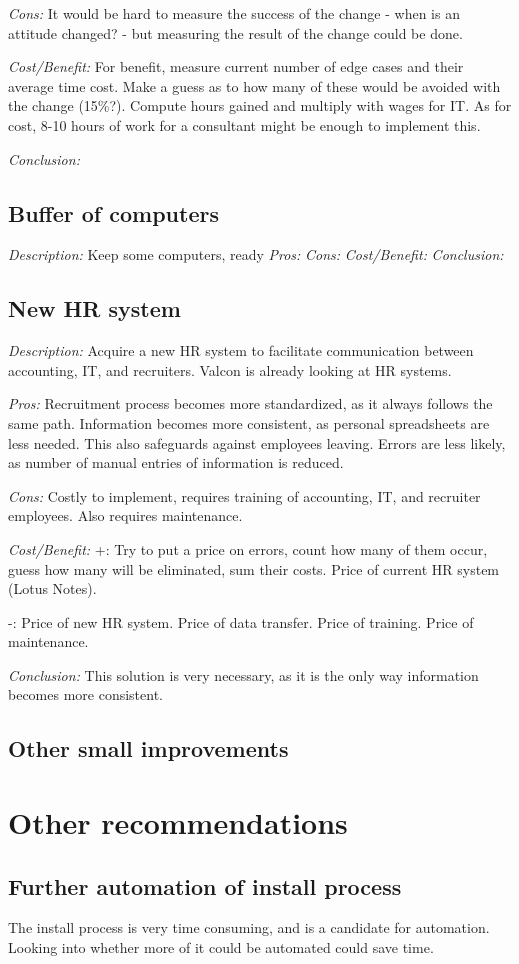 \emph{Cons:} It would be hard to measure the success of the change - when is an attitude changed? - but measuring the result of the change could be done.

\emph{Cost/Benefit:} For benefit, measure current number of edge cases and their average time cost.
Make a guess as to how many of these would be avoided with the change (15\%?).
Compute hours gained and multiply with wages for IT.
As for cost, 8-10 hours of work for a consultant might be enough to implement this.

\emph{Conclusion:} 

\subsection{Buffer of computers}
\emph{Description:} Keep some computers, ready 
\emph{Pros:}
\emph{Cons:}
\emph{Cost/Benefit:}
\emph{Conclusion:}

\subsection{New HR system}
\emph{Description:} Acquire a new HR system to facilitate communication between accounting, IT, and recruiters.
Valcon is already looking at HR systems.

\emph{Pros:} Recruitment process becomes more standardized, as it always follows the same path.
Information becomes more consistent, as personal spreadsheets are less needed. 
This also safeguards against employees leaving.
Errors are less likely, as number of manual entries of information is reduced.

\emph{Cons:} Costly to implement, requires training of accounting, IT, and recruiter employees.
Also requires maintenance.

\emph{Cost/Benefit:} +: Try to put a price on errors, count how many of them occur, guess how many will be eliminated, sum their costs.
Price of current HR system (Lotus Notes).

-: Price of new HR system.
Price of data transfer.
Price of training.
Price of maintenance.

\emph{Conclusion:} This solution is very necessary, as it is the only way information becomes more consistent.

\subsection{Other small improvements}

\section{Other recommendations}
\subsection{Further automation of install process}
The install process is very time consuming, and is a candidate for automation.
Looking into whether more of it could be automated could save time.
